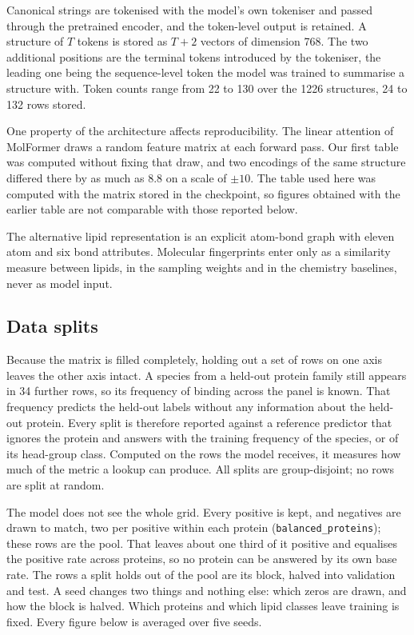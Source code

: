 Canonical strings are tokenised with the model's own tokeniser and passed through the pretrained
encoder, and the token-level output is retained. A structure of $T$ tokens is stored as $T+2$
vectors of dimension 768. The two additional positions are the terminal tokens introduced by the
tokeniser, the leading one being the sequence-level token the model was trained to summarise a
structure with. Token counts range from 22 to 130 over the 1226 structures, 24 to 132 rows stored.

One property of the architecture affects reproducibility. The linear attention of MolFormer draws
a random feature matrix at each forward pass. Our first table was computed without fixing that
draw, and two encodings of the same structure differed there by as much as 8.8 on a scale of $\pm
10$. The table used here was computed with the matrix stored in the checkpoint, so figures
obtained with the earlier table are not comparable with those reported below.

The alternative lipid representation is an explicit atom-bond graph with eleven atom and six bond
attributes. Molecular fingerprints enter only as a similarity measure between lipids, in the
sampling weights and in the chemistry baselines, never as model input.

\subsection{Data splits}
\label{sec:splits}

Because the matrix is filled completely, holding out a set of rows on one axis leaves the other
axis intact. A species from a held-out protein family still appears in 34 further rows, so its
frequency of binding across the panel is known. That frequency predicts the held-out labels
without any information about the held-out protein. Every split is therefore reported against a
reference predictor that ignores the protein and answers with the training frequency of the
species, or of its head-group class. Computed on the rows the model receives, it measures how much
of the metric a lookup can produce. All splits are group-disjoint; no rows are split at random.

The model does not see the whole grid. Every positive is kept, and negatives are drawn to match,
two per positive within each protein (\texttt{balanced\_proteins}); these rows are the pool. That
leaves about one third of it positive and equalises the positive rate across proteins, so no
protein can be answered by its own base rate. The rows a split holds out of the pool are its
block, halved into validation and test. A seed changes two things and nothing else: which zeros
are drawn, and how the block is halved. Which proteins and which lipid classes leave training is
fixed. Every figure below is averaged over five seeds.

